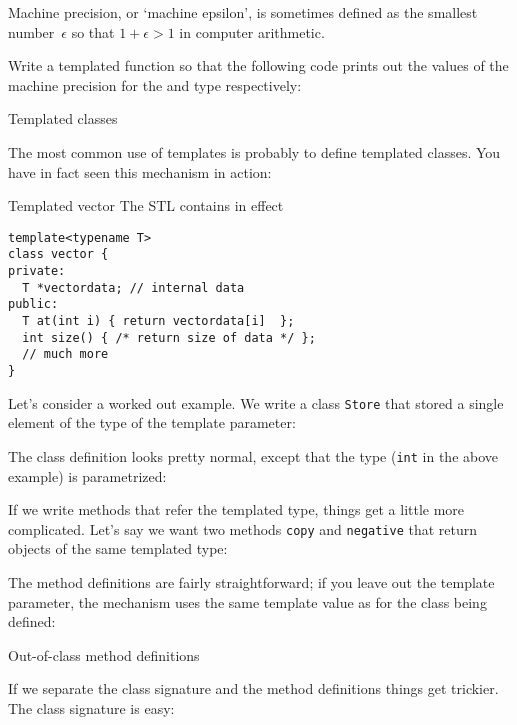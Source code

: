 \begin{exercise}
  \label{ex:eps-template}
  Machine precision, or `machine epsilon', is sometimes defined as the
  smallest number~$\epsilon$ so that $1+\epsilon>1$ in computer
  arithmetic.

  Write a templated function  so that the following code
  prints out the values of the machine precision for the  and
   type respectively:
\end{exercise}

 {Templated classes}

The most common use of templates is probably to define templated
classes.
You have in fact seen this mechanism in action:

\begin{block}{Templated vector}
  \label{sl:template-vector}
  The \ac{STL} contains
  in effect
\begin{lstlisting}
template<typename T>
class vector {
private:
  T *vectordata; // internal data
public:
  T at(int i) { return vectordata[i]  };
  int size() { /* return size of data */ };
  // much more
}
\end{lstlisting}
\end{block}

Let's consider a worked out example.
We write a class \lstinline+Store+
that stored a single element of the type
of the template parameter:
%

The class definition looks pretty normal,
except that the type (\lstinline+int+ in the above example)
is parametrized:
%

If we write methods that refer the templated type,
things get a little more complicated.
Let's say we want two methods \lstinline+copy+ and \lstinline+negative+
that return objects of the same templated type:
%

The method definitions are fairly straightforward;
if you leave out the template parameter,
the 
mechanism uses the same template value 
as for the class being defined:
%

 {Out-of-class method definitions}

If we separate the class signature and the method definitions
things get trickier.
The class signature is easy:
%

